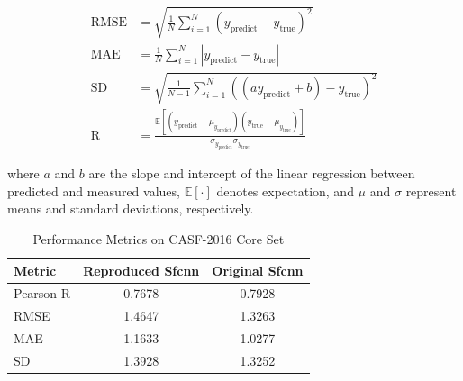 \documentclass[unnumsec,webpdf,contemporary,large]{oup-authoring-template}
\theoremstyle{thmstyleone}%
\theoremstyle{thmstyletwo}%
\theoremstyle{thmstylethree}%
\begin{document}
\begin{align*}
\mathrm{RMSE} &= \sqrt{\frac{1}{N} \sum_{i=1}^{N} (y_{\text{predict}} - y_{\text{true}})^2} \\
\mathrm{MAE} &= \frac{1}{N} \sum_{i=1}^{N} |y_{\text{predict}} - y_{\text{true}}| \\
\mathrm{SD} &= \sqrt{\frac{1}{N-1} \sum_{i=1}^{N} ((a y_{\text{predict}} + b) - y_{\text{true}})^2} \\
\mathrm{R} &= \frac{\mathbb{E}[(y_{\text{predict}} - \mu_{y_{\text{predict}}})(y_{\text{true}} - \mu_{y_{\text{true}}})]}{\sigma_{y_{\text{predict}}} \sigma_{y_{\text{true}}}}
\end{align*}

where $a$ and $b$ are the slope and intercept of the linear regression between predicted and measured values, $\mathbb{E}[\cdot]$ denotes expectation, and $\mu$ and $\sigma$ represent means and standard deviations, respectively.

\begin{table}[H]
\centering
\caption{Performance Metrics on CASF-2016 Core Set}
\label{tab:metrics}
\begin{tabular}{lcc}
\toprule
Metric & Reproduced Sfcnn & Original Sfcnn \\
\midrule
Pearson R & 0.7678 & 0.7928 \\
RMSE & 1.4647 & 1.3263 \\
MAE & 1.1633 & 1.0277 \\
SD & 1.3928 & 1.3252 \\
\bottomrule
\end{tabular}
\end{table}
\end{document}
